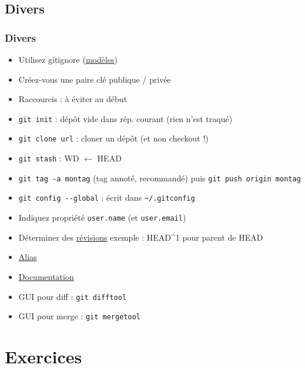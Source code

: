 \documentclass[english, french]{beamer}
\begin{document}
\subsection{Divers}
\begin{frame}
	\frametitle{Divers}
	\vspace{-1pt}
	\begin{itemize}
		\item Utilisez gitignore {\tiny (\href{https://github.com/github/gitignore}{modèles})}
		\item Créez-vous une paire clé publique / privée
		\item Raccourcis : à éviter au début
		\item \texttt{git init} : dépôt vide dans rép. courant (rien n’est traqué)
		\item \texttt{git clone url} : cloner un dépôt (et non checkout !)
		\item \texttt{git stash} : WD $←$ HEAD
		\item \texttt{git tag -a montag} {\tiny (tag annoté, recommandé)} puis \texttt{git push origin montag}
		\item \texttt{git config -{}-global} : écrit dans \texttt{\textasciitilde/.gitconfig}
		\item Indiquez propriété \texttt{user.name} (et \texttt{user.email})
		\item Déterminer des \href{https://git-scm.com/book/en/v2/Git-Tools-Revision-Selection}{révisions} {\tiny exemple : HEAD\textasciicircum 1 pour parent de HEAD}
		\item \href{https://git-scm.com/book/en/v2/Git-Basics-Git-Aliases}{Alias}
		\item \href{https://git-scm.com/book/en/v2}{Documentation}
		\item GUI pour diff : \texttt{git difftool}
		\item GUI pour merge : \texttt{git mergetool}
	\end{itemize}
\end{frame}

\section{Exercices}
\end{document}
